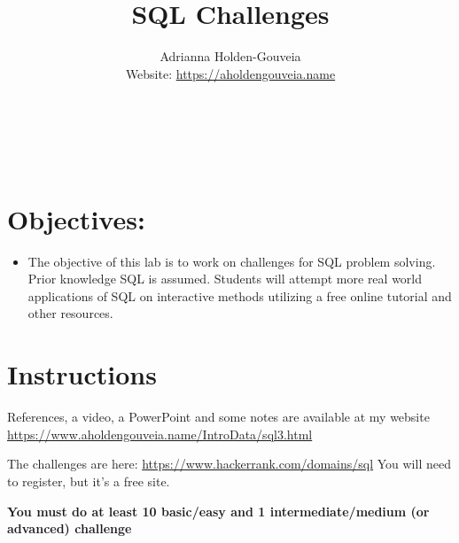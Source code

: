 \documentclass[12pt]{article}
\title{SQL Challenges}
\author{
        Adrianna Holden-Gouveia \\
        Website: \url{https://aholdengouveia.name}\\ 
        \date{\vspace{-5ex}}
        \faLinkedin{: aholdengouveia} \\
        \faGithub {: aholdengouveia} \\
        \faTwitter {: aholdengouveia} \\
        }
\begin{document}
    

\maketitle


\section*{Objectives:}
\begin{itemize}
    \item The objective of this lab is to work on challenges for SQL problem solving. Prior knowledge SQL is assumed. Students will attempt more real world applications of SQL on interactive methods utilizing a free online tutorial and other resources.
\end{itemize}
\section*{Instructions}

References, a video, a PowerPoint and some notes are available at my website
\url {https://www.aholdengouveia.name/IntroData/sql3.html}

The challenges are here: \url{https://www.hackerrank.com/domains/sql} You will need to register, but it's a free site. 


\textbf{You must do at least 10 basic/easy and 1 intermediate/medium (or advanced) challenge}
\end{document}

